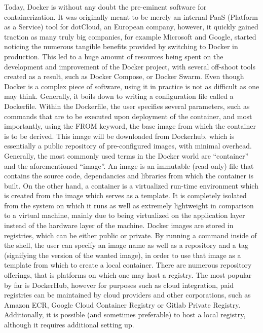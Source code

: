 \documentclass[thesis=B,english]{FITthesis}[2019/12/23]
\begin{document}
Today, Docker is without any doubt the pre-eminent software for containerization. It was originally meant to be merely an internal PaaS (Platform as a Service) tool for dotCloud, an European company, however, it quickly gained traction as many truly big companies, for example Microsoft and Google, started noticing the numerous tangible benefits provided by switching to Docker in production. \cite{docker-java} This led to a huge amount of resources being spent on the development and improvement of the Docker project, with several off-shoot tools created as a result, such as Docker Compose, or Docker Swarm.
\newline
Even though Docker is a complex piece of software, using it in practice is not as difficult as one may think. Generally, it boils down to writing a configuration file called a Dockerfile. Within the Dockerfile, the user specifies several parameters, such as commands that are to be executed upon deployment of the container, and most importantly, using the FROM keyword, the base image from which the container is to be derived. This image will be downloaded from Dockerhub, which is essentially a public repository of pre-configured images, with minimal overhead. 
\newline
Generally, the most commonly used terms in the Docker world are “container” and the aforementioned “image”. An image is an immutable (read-only) file that contains the source code, dependancies and libraries from which the container is built. On the other hand, a container is a virtualized run-time environment which is created from the image which serves as a template. \cite{docker-phoenix} It is completely isolated from the system on which it runs as well as extremely lightweight in comparison to a virtual machine, mainly due to being virtualized on the application layer instead of the hardware layer of the machine. 
\newline
Docker images are stored in registries, which can be either public or private. By running a command inside of the shell, the user can specify an image name as well as a repository and a tag (signifying the version of the wanted image), in order to use that image as a template from which to create a local container. There are numerous repository offerings, that is platforms on which one may host a registry. The most popular by far is DockerHub, however for purposes such as cloud integration, paid registries can be maintained by cloud providers and other corporations, such as Amazon ECR, Google Cloud Container Registry or Gitlab Private Registry. Additionally, it is possible (and sometimes preferable) to host a local registry, although it requires additional setting up.
\end{document}
